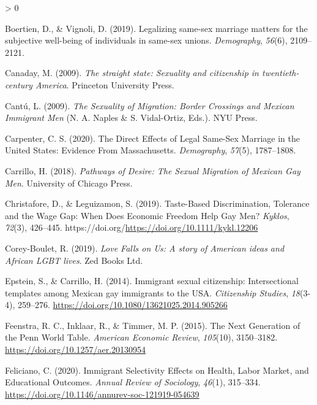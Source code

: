 \documentclass[
  11pt,
]{article}
\newlength{\cslhangindent}
\newenvironment{CSLReferences}[2] %
 {%
  \setlength{\parindent}{0pt}
  \ifodd #1 \everypar{\setlength{\hangindent}{\cslhangindent}}\ignorespaces\fi
  \ifnum #2 > 0
  \setlength{\parskip}{#2\baselineskip}
  \fi
 }%
 {}
\begin{document}
\begin{CSLReferences}{1}{0}
\leavevmode\hypertarget{ref-boertien_2019}{}%
Boertien, D., \& Vignoli, D. (2019). Legalizing same-sex marriage matters for the subjective well-being of individuals in same-sex unions. \emph{Demography}, \emph{56}(6), 2109--2121.

\leavevmode\hypertarget{ref-canaday_2009}{}%
Canaday, M. (2009). \emph{The straight state: Sexuality and citizenship in twentieth-century {America}}. Princeton University Press.

\leavevmode\hypertarget{ref-cantu_2009}{}%
Cantú, L. (2009). \emph{The {Sexuality} of {Migration}: {Border} {Crossings} and {Mexican} {Immigrant} {Men}} (N. A. Naples \& S. Vidal-Ortiz, Eds.). NYU Press.

\leavevmode\hypertarget{ref-carpenter_2020}{}%
Carpenter, C. S. (2020). The {Direct} {Effects} of {Legal} {Same}-{Sex} {Marriage} in the {United} {States}: {Evidence} {From} {Massachusetts}. \emph{Demography}, \emph{57}(5), 1787--1808.

\leavevmode\hypertarget{ref-carrillo_2018}{}%
Carrillo, H. (2018). \emph{Pathways of {Desire}: {The} {Sexual} {Migration} of {Mexican} {Gay} {Men}}. University of Chicago Press.

\leavevmode\hypertarget{ref-christafore_2019}{}%
Christafore, D., \& Leguizamon, S. (2019). Taste-{Based} {Discrimination}, {Tolerance} and the {Wage} {Gap}: {When} {Does} {Economic} {Freedom} {Help} {Gay} {Men}? \emph{Kyklos}, \emph{72}(3), 426--445. https://doi.org/\url{https://doi.org/10.1111/kykl.12206}

\leavevmode\hypertarget{ref-corey-boulet_2019}{}%
Corey-Boulet, R. (2019). \emph{Love {Falls} on {Us}: A story of {American} ideas and {African} {LGBT} lives}. Zed Books Ltd.

\leavevmode\hypertarget{ref-epstein_2014}{}%
Epstein, S., \& Carrillo, H. (2014). Immigrant sexual citizenship: Intersectional templates among {Mexican} gay immigrants to the {USA}. \emph{Citizenship Studies}, \emph{18}(3-4), 259--276. \url{https://doi.org/10.1080/13621025.2014.905266}

\leavevmode\hypertarget{ref-feenstra_2015}{}%
Feenstra, R. C., Inklaar, R., \& Timmer, M. P. (2015). The {Next} {Generation} of the {Penn} {World} {Table}. \emph{American Economic Review}, \emph{105}(10), 3150--3182. \url{https://doi.org/10.1257/aer.20130954}

\leavevmode\hypertarget{ref-feliciano_2020}{}%
Feliciano, C. (2020). Immigrant {Selectivity} {Effects} on {Health}, {Labor} {Market}, and {Educational} {Outcomes}. \emph{Annual Review of Sociology}, \emph{46}(1), 315--334. \url{https://doi.org/10.1146/annurev-soc-121919-054639}


\end{CSLReferences}
\end{document}
